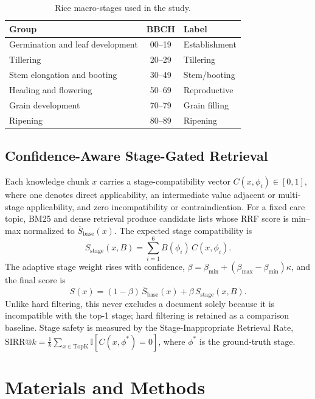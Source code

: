 \documentclass{llncs}
\begin{document}
\begin{table}[t]
\centering
\caption{Rice macro-stages used in the study.}
\label{tab:stages}
\begin{tabular}{lcl}
\toprule
\textbf{Group} & \textbf{BBCH} & \textbf{Label} \\
\midrule
Germination and leaf development & 00--19 & Establishment \\
Tillering & 20--29 & Tillering \\
Stem elongation and booting & 30--49 & Stem/booting \\
Heading and flowering & 50--69 & Reproductive \\
Grain development & 70--79 & Grain filling \\
Ripening & 80--89 & Ripening \\
\bottomrule
\end{tabular}
\end{table}

\subsection{Confidence-Aware Stage-Gated Retrieval}

Each knowledge chunk $x$ carries a stage-compatibility vector $C(x,\phi_i)\in[0,1]$, where one denotes direct applicability, an intermediate value adjacent or multi-stage applicability, and zero incompatibility or contraindication. For a fixed care topic, BM25 and dense retrieval produce candidate lists whose RRF score is min--max normalized to $\overline{S}_{\mathrm{base}}(x)$. The expected stage compatibility is
\begin{equation}
S_{\mathrm{stage}}(x,B)=\sum_{i=1}^{6}B(\phi_i)\,C(x,\phi_i).
\end{equation}
The adaptive stage weight rises with confidence, $\beta=\beta_{\min}+(\beta_{\max}-\beta_{\min})\kappa$, and the final score is
\begin{equation}
S(x)=(1-\beta)\,\overline{S}_{\mathrm{base}}(x)+\beta\,S_{\mathrm{stage}}(x,B).
\end{equation}
Unlike hard filtering, this never excludes a document solely because it is incompatible with the top-1 stage; hard filtering is retained as a comparison baseline. Stage safety is measured by the Stage-Inappropriate Retrieval Rate, $\mathrm{SIRR}@k=\frac{1}{k}\sum_{x\in\mathrm{TopK}}\mathbb{I}[C(x,\phi^*)=0]$, where $\phi^*$ is the ground-truth stage.

\section{Materials and Methods}
\end{document}
